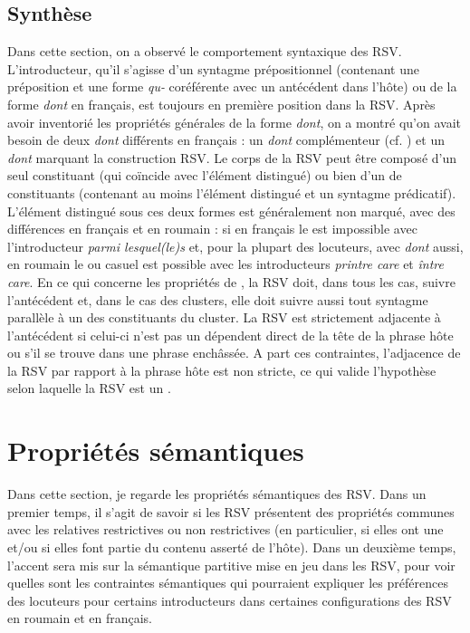 \subsection{Synthèse}\label{ch3:sect3.2.4}

Dans cette section, on a observé le comportement syntaxique des RSV. L’introducteur, qu’il s’agisse d’un syntagme prépositionnel (contenant une préposition et une forme \textit{qu-} coréférente avec un antécédent dans l’hôte) ou de la forme \textit{dont} en français, est toujours en première position dans la RSV. Après avoir inventorié les propriétés générales de la forme \textit{dont}, on a montré qu’on avait besoin de deux \textit{dont} différents en français : un \textit{dont} complémenteur (cf. \citealt{Godard1988,Godard1989,AbeilleEtAl2006,AbeilleEtAl2007}) et un \textit{dont} marquant la construction RSV. Le corps de la RSV peut être composé d’un seul constituant (qui coïncide avec l’élément distingué) ou bien d’un  de constituants (contenant au moins l’élément distingué et un syntagme prédicatif). L’élément distingué sous ces deux formes est généralement non marqué, avec des différences en français et en roumain : si en français le  est impossible avec l’introducteur \textit{parmi lesquel(le)s} et, pour la plupart des locuteurs, avec \textit{dont} aussi, en roumain le  ou casuel est possible avec les introducteurs \textit{printre care} et \textit{între care}. En ce qui concerne les propriétés de , la RSV doit, dans tous les cas, suivre l’antécédent et, dans le cas des clusters, elle doit suivre aussi tout syntagme parallèle à un des constituants du cluster. La RSV est strictement adjacente à l’antécédent si celui-ci n’est pas un dépendent direct de la tête de la phrase hôte ou s’il se trouve dans une phrase enchâssée. A part ces contraintes, l’adjacence de la RSV par rapport à la phrase hôte est non stricte, ce qui valide l’hypothèse selon laquelle la RSV est un .


\section{Propriétés sémantiques}\label{ch3:sect3.3}

Dans cette section, je regarde les propriétés sémantiques des RSV. Dans un premier temps, il s’agit de savoir si les RSV présentent des propriétés communes avec les relatives restrictives ou non restrictives (en particulier, si elles ont une  et/ou si elles font partie du contenu asserté de l’hôte). Dans un deuxième temps, l’accent sera mis sur la sémantique partitive mise en jeu dans les RSV, pour voir quelles sont les contraintes sémantiques qui pourraient expliquer les préférences des locuteurs pour certains introducteurs dans certaines configurations des RSV en roumain et en français. 


